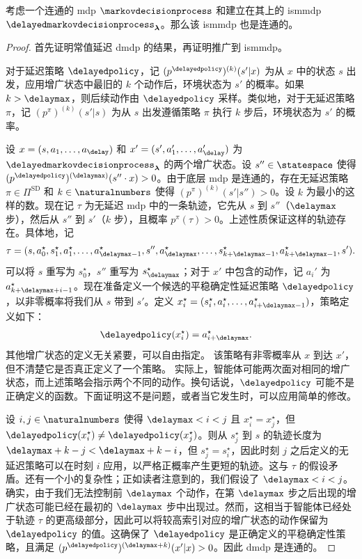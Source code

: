 \begin{prop}
\label{pp:communicating_ismmdp}
    考虑一个连通的 \gls{mdp} $\markovdecisionprocess$ 和建立在其上的 \gls{ismmdp} $\delayedmarkovdecisionprocess_{\boldsymbol\lambda}$。那么该 \gls{ismmdp} 也是连通的。
\end{prop}
\begin{proof}
    首先证明常值延迟 \gls{dmdp} 的结果，再证明推广到 \gls{ismmdp}。

    对于延迟策略 $\delayedpolicy$，记 $(p^\delayedpolicy)^{(k)}(s'\vert x)$ 为从 $x$ 中的状态 $s$ 出发，应用增广状态中最旧的 $k$ 个动作后，环境状态为 $s'$ 的概率。如果 $k>\delaymax$，则后续动作由 $\delayedpolicy$ 采样。类似地，对于无延迟策略 $\pi$，记 $(p^\pi)^{(k)}(s'\vert s)$ 为从 $s$ 出发遵循策略 $\pi$ 执行 $k$ 步后，环境状态为 $s'$ 的概率。

    设 $x=(s,a_1,\dots,a_\delay)$ 和 $x'=(s',a_1',\dots,a_\delay')$ 为 $\delayedmarkovdecisionprocess_{\boldsymbol\lambda}$ 的两个增广状态。设 $s''\in\statespace$ 使得 $(p^\delayedpolicy)^{(\delaymax)}(s''\cdot x)>0$。由于底层 \gls{mdp} 是连通的，存在无延迟策略 $\pi\in\Pi^{\text{SD}}$ 和 $k\in\naturalnumbers$ 使得 $(p^\pi)^{(k)}(s'\vert s'')>0$。设 $k$ 为最小的这样的数。现在记 $\tau$ 为无延迟 \gls{mdp} 中的一条轨迹，它先从 $s$ 到 $s''$（$\delaymax$ 步），然后从 $s''$ 到 $s'$（$k$ 步），且概率 $p^\pi(\tau)>0$。上述性质保证这样的轨迹存在。具体地，记
    \begin{align*}
        \tau=(s,a_0^\star,s_1^\star,a_1^\star,\dots,a_{\delaymax-1}^\star,s'',a_{\delaymax}^\star,\dots,s_{k+\delaymax-1}^\star,a_{k+\delaymax-1}^\star,s').
    \end{align*}
    可以将 $s$ 重写为 $s_0^\star$，$s''$ 重写为 $s_{\delaymax}^\star$；对于 $x'$ 中包含的动作，记 $a_i'$ 为 $a_{k+\delaymax+i-1}^\star$。现在准备定义一个候选的平稳确定性延迟策略 $\delayedpolicy$，以非零概率将我们从 $s$ 带到 $s'$。定义 $x_i^\star=(s_i^\star,a_i^\star,\dots,a_{i+\delaymax-1}^\star)$，策略定义如下：
    \begin{align*}
        &\delayedpolicy(x_i^\star) = a_{i+\delaymax}^\star.
    \end{align*}
    其他增广状态的定义无关紧要，可以自由指定。
    该策略有非零概率从 $x$ 到达 $x'$，但不清楚它是否真正定义了一个策略。
    实际上，智能体可能两次面对相同的增广状态，而上述策略会指示两个不同的动作。换句话说，$\delayedpolicy$ 可能不是正确定义的函数。下面证明这不是问题，或者当它发生时，可以应用简单的修改。

    设 $i,j\in\naturalnumbers$ 使得 $\delaymax<i<j$ 且 $x_i^\star=x_j^\star$，但 $\delayedpolicy(x_i^\star)\neq \delayedpolicy(x_j^\star)$。则从 $s_j^\star$ 到 $s$ 的轨迹长度为 $\delaymax+k-j<\delaymax+k-i$，但 $s_j^\star=s_i^\star$，因此时刻 $j$ 之后定义的无延迟策略可以在时刻 $i$ 应用，以严格正概率产生更短的轨迹。这与 $\tau$ 的假设矛盾。还有一个小的复杂性；正如读者注意到的，我们假设了 $\delaymax<i<j$。确实，由于我们无法控制前 $\delaymax$ 个动作，在第 $\delaymax$ 步之后出现的增广状态可能已经在最初的 $\delaymax$ 步中出现过。然而，这相当于智能体已经处于轨迹 $\tau$ 的更高级部分，因此可以将较高索引对应的增广状态的动作保留为 $\delayedpolicy$ 的值。这确保了 $\delayedpolicy$ 是正确定义的平稳确定性策略，且满足 $(p^\delayedpolicy)^{(\delaymax+k)}(x'\vert x)>0$。因此 \gls{dmdp} 是连通的。


\end{proof}
